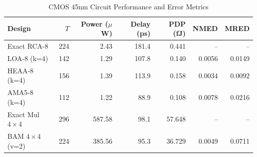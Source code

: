 \begin{table}[t]
\centering
\caption{CMOS 45nm Circuit Performance and Error Metrics}
\label{tab:comparison}
\begin{tabular}{lrrrrrr}
\toprule
Design & $T$ & Power ($\mu$W) & Delay (ps) & PDP (fJ) & NMED & MRED \\
\midrule
Exact RCA-8 & 224 & 2.43 & 181.4 & 0.441 & -- & -- \\
LOA-8 (k=4) & 142 & 1.29 & 107.8 & 0.140 & 0.0056 & 0.0149 \\
HEAA-8 (k=4) & 156 & 1.39 & 113.9 & 0.158 & 0.0034 & 0.0092 \\
AMA5-8 (k=4) & 112 & 1.22 & 88.9 & 0.108 & 0.0078 & 0.0216 \\
Exact Mul $4{\times}4$ & 296 & 587.58 & 98.1 & 57.648 & -- & -- \\
BAM $4{\times}4$ (v=2) & 224 & 385.56 & 95.3 & 36.729 & 0.0049 & 0.0711 \\
\bottomrule
\end{tabular}
\end{table}